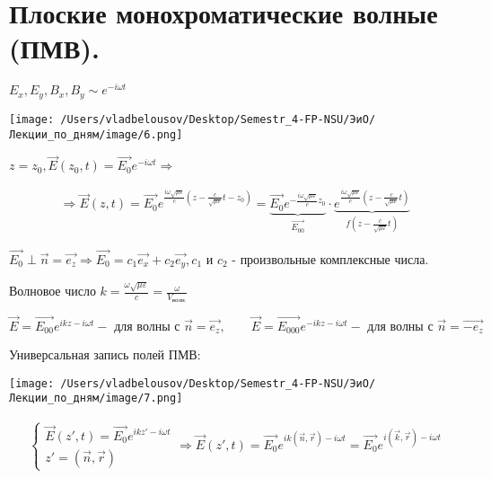 \documentclass[12pt, a4paper]{report}
\begin{document}
\section{Плоские монохроматические волные (ПМВ).}

\( E_x, E_y, B_x, B_y \sim e^{-i \omega t}   \) 

\text{ }

\begin{minipage}{0.5\textwidth}
    \texttt{[image: /Users/vladbelousov/Desktop/Semestr\_4-FP-NSU/ЭиО/Лекции\_по\_дням/image/6.png]}
\end{minipage}
\begin{minipage}{0.5\textwidth}
     \( z = z_0 , \vec{E}( z_0,t )= \vec{E_0}e^{-i \omega t} \Rightarrow  \) 
\end{minipage}

\begin{gather*}
    \displaystyle  \Rightarrow  \vec{E}( z,t)= \vec{E_0} e^{\frac{i \omega \sqrt{ \mu \varepsilon}}{c} \left( z- \frac{c}{\sqrt{\mu \varepsilon}} t -z_0  \right) }= \underbrace{\vec{E_0}e^{-\frac{i \omega \sqrt{ \mu \varepsilon}}{c}z_0} }_{\vec{E_{00}}} \cdot \underbrace{e^{\frac{i \omega \sqrt{ \mu \varepsilon}}{c} \left( z - \frac{c}{\sqrt{ \mu \varepsilon}}t  \right)} } _{f (z - \frac{c}{\sqrt{ \mu \varepsilon}}t)}   
\end{gather*}

\( \vec{E_0 } \perp \vec{n} = \vec{e_z} \Rightarrow \vec{E_0}=c_1 \vec{e_x}+ c_2 \vec{e_y}, c_1 \text{ и } c_2   \) - произвольные комплексные числа. 

\begin{definition}
    Волновое число \( k = \frac{\omega \sqrt{ \mu \varepsilon}}{c} = \frac{\omega}{V_{\text{волн.} } }   \) 
\end{definition}

\[ \displaystyle \vec{E}= \vec{E_{00}}e^{ikz- i \omega t } - \text{ для волны с } \vec{n} = \vec{e_z}, \qquad \vec{E}= \vec{E_{000}}e^{-ikz- i \omega t } - \text{ для волны с } \vec{n} = \vec{-e_z}  \] 

Универсальная запись полей ПМВ: 

\begin{center}
    \texttt{[image: /Users/vladbelousov/Desktop/Semestr\_4-FP-NSU/ЭиО/Лекции\_по\_дням/image/7.png]}
\end{center}

\[ \begin{aligned}
    \begin{cases}
        \displaystyle \vec{E}( z', t)= \vec{E_0 }e^{ikz' - i \omega t } \\  
        z'= (\vec{n}, \vec{r})
    \end{cases}
    \Rightarrow
    \displaystyle \vec{E}( z', t)= \vec{E_0}e^{ik(\vec{n}, \vec{r}) - i \omega t }= \vec{E_0}e^{i(\vec{k}, \vec{r}) - i \omega t }
\end{aligned} \] 

\ifdefined\mainfile
\else
    
\end{document}
